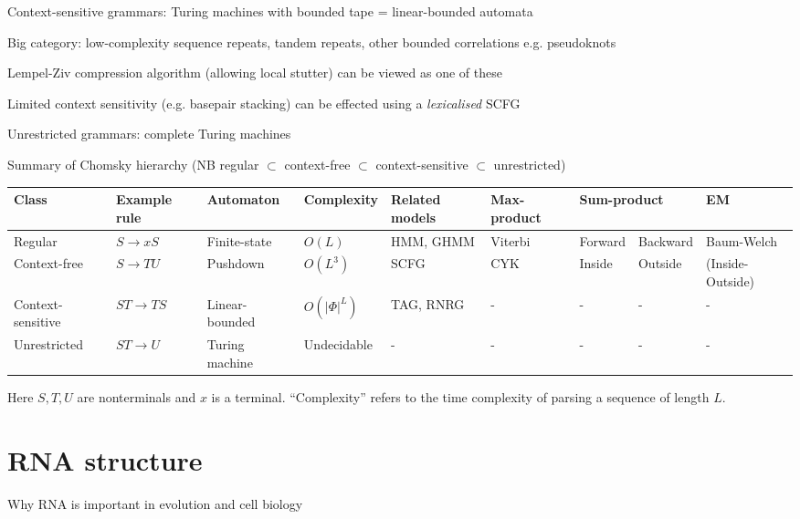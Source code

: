 \documentclass{beamer}
\begin{document}
\begin{frame}{}
  \iteme
 \item Context-sensitive grammars: Turing machines with bounded tape = linear-bounded automata
  \itemb
  \item Big category: low-complexity sequence repeats, tandem repeats, other bounded correlations e.g. pseudoknots
  \item Lempel-Ziv compression algorithm (allowing local stutter) can be viewed as one of these
  \item Limited context sensitivity (e.g. basepair stacking) can be effected using a {\em lexicalised} SCFG
  \iteme
 \item Unrestricted grammars: complete Turing machines
 \iteme
\item Summary of Chomsky hierarchy (NB regular $\subset$ context-free $\subset$ context-sensitive $\subset$ unrestricted)
\\
\begin{tabular}{lllllllll}
Class & Example rule & Automaton & Complexity & Related models & Max-product & \multicolumn{2}{l}{Sum-product} & EM \\
\hline
Regular & $S \to x S$ & Finite-state & $O(L)$ & HMM, GHMM & Viterbi & Forward & Backward & Baum-Welch \\
Context-free & $S \to T U$ & Pushdown & $O(L^3)$ & SCFG & CYK & Inside & Outside & (Inside-Outside) \\
Context-sensitive & $S T \to T S$ & Linear-bounded & $O(|\Phi|^L)$ & TAG, RNRG & - & - & - & - \\
Unrestricted & $S T \to U$ & Turing machine & Undecidable & - & - & - & - & -
\end{tabular}
Here $S,T,U$ are nonterminals and $x$ is a terminal.
``Complexity'' refers to the time complexity of parsing a sequence of length $L$.
\iteme

\end{frame}

\section{RNA structure}

\begin{frame}{}

\itemb
\item Why RNA is important in evolution and cell biology
\iteme
\end{frame}
\end{document}

